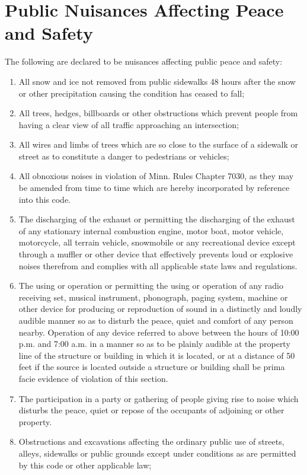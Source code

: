\documentclass[code.tex]{subfiles}
\begin{document}
\section{Public Nuisances Affecting Peace and Safety}
The following are declared to be nuisances affecting public peace and safety:
\begin{enumerate}[{\indent}A)]
    \item All snow and ice not removed from public sidewalks 48 hours after the snow or other precipitation causing the condition has ceased to fall;
    \item All trees, hedges, billboards or other obstructions which prevent people from having a clear view of all traffic approaching an intersection;
    \item All wires and limbs of trees which are so close to the surface of a sidewalk or street as to constitute a danger to pedestrians or vehicles;
    \item All obnoxious noises in violation of Minn. Rules Chapter 7030, as they may be amended from time to time which are hereby incorporated by reference into this code.  
    \item The discharging of the exhaust or permitting the discharging of the exhaust of any stationary internal combustion engine, motor boat, motor vehicle, motorcycle, all terrain vehicle, snowmobile or any recreational device except through a muffler or other device that effectively prevents loud or explosive noises therefrom and complies with all applicable state laws and regulations.
    \item The using or operation or permitting the using or operation of any radio receiving set, musical instrument, phonograph, paging system, machine or other device for producing or reproduction of sound in a distinctly and loudly audible manner so as to disturb the peace, quiet and comfort of any person nearby. Operation of any device referred to above between the hours of 10:00 p.m. and 7:00 a.m. in a manner so as to be plainly audible at the property line of the structure or building in which it is located, or at a distance of 50 feet if the source is located outside a structure or building shall be prima facie evidence of violation of this section.
    \item The participation in a party or gathering of people giving rise to noise which disturbs the peace, quiet or repose of the occupants of adjoining or other property.
    \item Obstructions and excavations affecting the ordinary public use of streets, alleys, sidewalks or public grounds except under conditions as are permitted by this code or other applicable law;

\end{enumerate}
\end{document}
